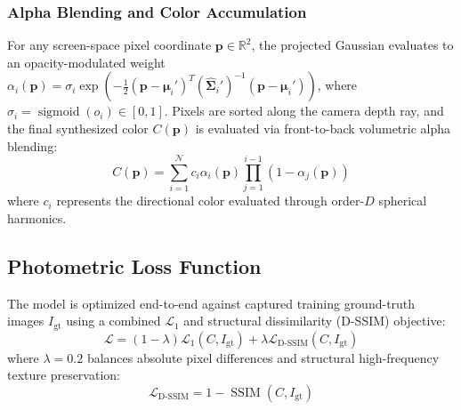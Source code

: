 \documentclass[conference]{IEEEtran}
\begin{document}
\subsubsection{Alpha Blending and Color Accumulation}
For any screen-space pixel coordinate $\mathbf{p} \in \mathbb{R}^2$, the projected Gaussian evaluates to an opacity-modulated weight $\alpha_i(\mathbf{p}) = \sigma_i \exp(-\frac{1}{2} (\mathbf{p} - \boldsymbol{\mu}_i')^T (\hat{\boldsymbol{\Sigma}}_i')^{-1} (\mathbf{p} - \boldsymbol{\mu}_i'))$, where $\sigma_i = \operatorname{sigmoid}(o_i) \in [0, 1]$. Pixels are sorted along the camera depth ray, and the final synthesized color $C(\mathbf{p})$ is evaluated via front-to-back volumetric alpha blending:
\begin{equation}
C(\mathbf{p}) = \sum_{i=1}^{\mathcal{N}} c_i \alpha_i(\mathbf{p}) \prod_{j=1}^{i-1} (1 - \alpha_j(\mathbf{p}))
\label{eq:alphablend}
\end{equation}
where $c_i$ represents the directional color evaluated through order-$D$ spherical harmonics.

\subsection{Photometric Loss Function}
The model is optimized end-to-end against captured training ground-truth images $I_{\text{gt}}$ using a combined $\mathcal{L}_1$ and structural dissimilarity (D-SSIM) objective:
\begin{equation}
\mathcal{L} = (1 - \lambda) \mathcal{L}_1(C, I_{\text{gt}}) + \lambda \mathcal{L}_{\text{D-SSIM}}(C, I_{\text{gt}})
\end{equation}
where $\lambda = 0.2$ balances absolute pixel differences and structural high-frequency texture preservation:
\begin{equation}
\mathcal{L}_{\text{D-SSIM}} = 1 - \operatorname{SSIM}(C, I_{\text{gt}})
\end{equation}
\end{document}
